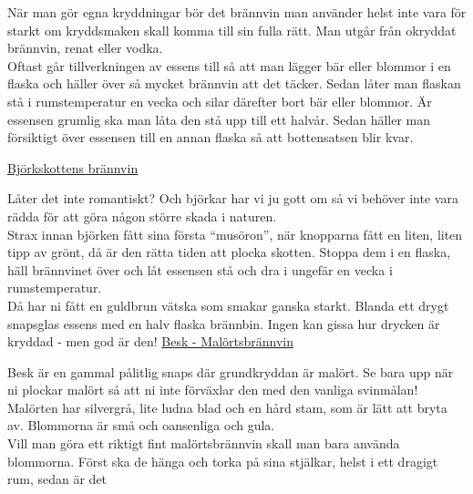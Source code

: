 \vspace{10pt}
\hspace{10pt}När man gör egna kryddningar bör det brännvin 
man använder helst inte vara för starkt om kryddsmaken 
skall komma till sin fulla rätt. Man utgår från okryddat 
brännvin, renat eller vodka.\\
\hspace*{10pt}Oftast går tillverkningen av essens till så att man 
lägger bär eller blommor i en flaska och häller över så 
mycket brännvin att det täcker. Sedan låter man flaskan 
stå i rumstemperatur en vecka och silar därefter bort bär 
eller blommor. Är essensen grumlig ska man låta den stå 
upp till ett halvår. Sedan häller man försiktigt över 
essensen till en annan flaska så att bottensatsen blir kvar.
\par\vspace{10pt}
\underline{Björkskottens brännvin}
\par\vspace{10pt}
\hspace*{10pt}Låter det inte romantiskt? Och björkar har vi ju gott 
om så vi behöver inte vara rädda för att göra någon större 
skada i naturen.\\
\hspace*{10pt}Strax innan björken fått sina första ``musöron'', när 
knopparna fått en liten, liten tipp av grönt, då är den rätta 
tiden att plocka skotten. Stoppa dem i en flaska, häll 
brännvinet över och låt essensen stå och dra i ungefär en 
vecka i rumstemperatur.\\
\hspace*{10pt}Då har ni fått en guldbrun vätska som smakar 
ganska starkt. Blanda ett drygt snapsglas essens med en 
halv flaska brännbin. Ingen kan gissa hur drycken är 
kryddad - men god är den!
\newpage
\underline{Besk - Malörtsbrännvin}
\par\vspace{10pt}
\hspace*{10pt}Besk är en gammal pålitlig snaps där grundkryddan 
är malört. Se bara upp när ni plockar malört så att ni inte 
förväxlar den med den vanliga svinmålan! Malörten har 
silvergrå, lite ludna blad och en hård stam, som är lätt att 
bryta av. Blommorna är små och oansenliga och gula.\\
\hspace*{10pt}Vill man göra ett riktigt fint malörtsbrännvin skall 
man bara använda blommorna. Först ska de hänga och 
torka på sina stjälkar, helst i ett dragigt rum, sedan är det 
